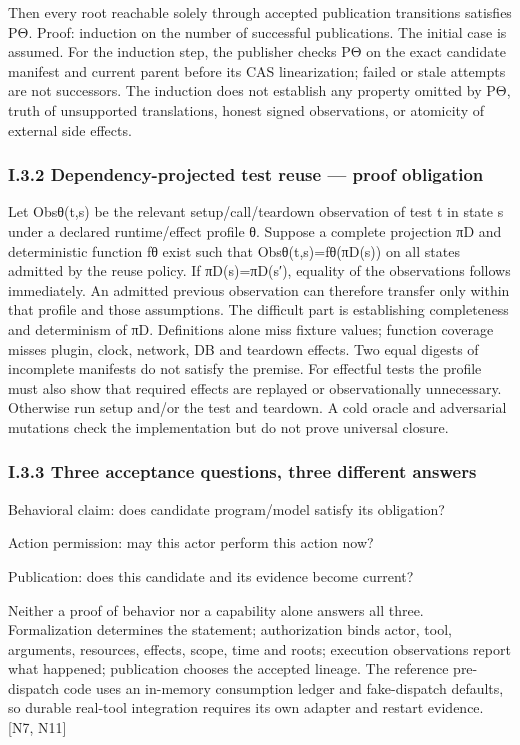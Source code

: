 Then every root reachable solely through accepted publication transitions satisfies PΘ. Proof:
induction on the number of successful publications. The initial case is assumed. For the induction
step, the publisher checks PΘ on the exact candidate manifest and current parent before its CAS
linearization; failed or stale attempts are not successors. The induction does not establish any property
omitted by PΘ, truth of unsupported translations, honest signed observations, or atomicity of external
side effects.

\subsubsection*{I.3.2 Dependency-projected test reuse — proof obligation}
Let Obsθ(t,s) be the relevant setup/call/teardown observation of test t in state s under a declared
runtime/effect profile θ. Suppose a complete projection πD and deterministic function fθ exist such
that Obsθ(t,s)=fθ(πD(s)) on all states admitted by the reuse policy. If πD(s)=πD(s′), equality of
the observations follows immediately. An admitted previous observation can therefore transfer only
within that profile and those assumptions.
The difficult part is establishing completeness and determinism of πD. Definitions alone miss fixture
values; function coverage misses plugin, clock, network, DB and teardown effects. Two equal digests
of incomplete manifests do not satisfy the premise. For effectful tests the profile must also show that
required effects are replayed or observationally unnecessary. Otherwise run setup and/or the test
and teardown. A cold oracle and adversarial mutations check the implementation but do not prove
universal closure.

\subsubsection*{I.3.3 Three acceptance questions, three different answers}
\noindent Behavioral claim: does candidate program/model satisfy its obligation?\par
\noindent Action permission: may this actor perform this action now?\par
\noindent Publication: does this candidate and its evidence become current?\par
Neither a proof of behavior nor a capability alone answers all three. Formalization determines
the statement; authorization binds actor, tool, arguments, resources, effects, scope, time and roots;
execution observations report what happened; publication chooses the accepted lineage. The reference
pre-dispatch code uses an in-memory consumption ledger and fake-dispatch defaults, so durable
real-tool integration requires its own adapter and restart evidence. [N7, N11]

